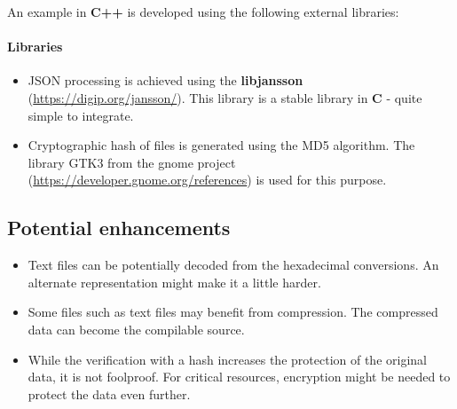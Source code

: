 \documentclass[12pt, a4paper]{article} %
\begin{document}
An example in \textbf{C++} is developed using the following external libraries:
\paragraph{Libraries}
\begin{itemize}
    \item JSON processing is achieved using the \textbf{libjansson} (\url{https://digip.org/jansson/}). This library is a stable library in \textbf{C} - quite simple to integrate.
    \item Cryptographic hash of files is generated using the MD5 algorithm. The library GTK3 from the gnome project (\url{https://developer.gnome.org/references}) is used for this purpose.
\end{itemize}

\paragraph{}

\subsection{Potential enhancements}
\begin{itemize}
    \item Text files can be potentially decoded from the hexadecimal conversions. An alternate representation might make it a little harder.
    \item Some files such as text files may benefit from compression. The compressed data can become the compilable source. 
    \item While the verification with a hash increases the protection of the original data, it is not foolproof. For critical resources, encryption might be needed to protect the data even further.
\end{itemize}
\end{document}
